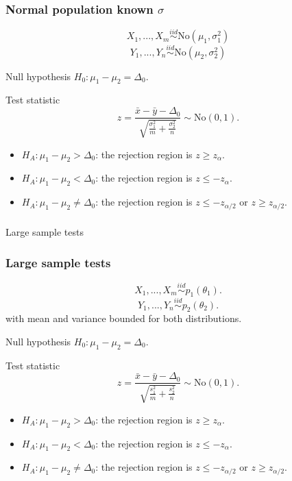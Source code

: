 \begin{frame}[fragile]\frametitle{Normal population known $\sigma$}

{\tiny

$$X_1,...,X_m \stackrel{iid}{\sim} \mbox{No}(\mu_1,\sigma_1^2)$$
$$Y_1,...,Y_n \stackrel{iid}{\sim} \mbox{No}(\mu_2,\sigma_2^2)$$

Null hypothesis $H_0: \mu_1 - \mu_2 = \Delta_0$.

Test statistic $$z = \frac{\bar{x}-\bar{y}-\Delta_0}{\sqrt{\frac{\sigma_1^2}{m}+\frac{\sigma_2^2}{n}}} \sim \mbox{No}(0,1).$$


\begin{itemize}

\item $H_A: \mu_1- \mu_2 > \Delta_0$: the rejection region is $z \geq z_{\alpha}$.
\item $H_A: \mu_1- \mu_2 < \Delta_0$: the rejection region is $z \leq -z_{\alpha}$.
\item $H_A: \mu_1- \mu_2 \neq \Delta_0$: the rejection region is $z \leq
  -z_{\alpha/2}$ or $z \geq z_{\alpha/2}$.

\end{itemize}
}

\end{frame}

\begin{frame}[fragile]\frametitle{}
\begin{center}
{\Large Large sample tests}

\end{center}
\end{frame}



\begin{frame}[fragile]\frametitle{Large sample tests}

{\tiny

$$X_1,...,X_m \stackrel{iid}{\sim} p_1(\theta_1).$$
$$Y_1,...,Y_n \stackrel{iid}{\sim} p_2(\theta_2).$$
with mean and variance bounded for both distributions.

Null hypothesis $H_0: \mu_1 - \mu_2 = \Delta_0$.

Test statistic $$z = \frac{\bar{x}-\bar{y}-\Delta_0}{\sqrt{\frac{s_1^2}{m}+\frac{s_2^2}{n}}} \sim \mbox{No}(0,1).$$


\begin{itemize}

\item $H_A: \mu_1- \mu_2 > \Delta_0$: the rejection region is $z \geq z_{\alpha}$.
\item $H_A: \mu_1- \mu_2 < \Delta_0$: the rejection region is $z \leq -z_{\alpha}$.
\item $H_A: \mu_1- \mu_2 \neq \Delta_0$: the rejection region is $z \leq
  -z_{\alpha/2}$ or $z \geq z_{\alpha/2}$.

\end{itemize}
}

\end{frame}


